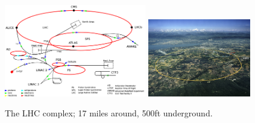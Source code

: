 \begin{figure}[hbp!]
\centering
\includegraphics[width=0.55\textwidth]{figs/lhcschematic.png}
\includegraphics[width=0.4\textwidth]{figs/lhc.jpg}
\caption{The LHC complex; 17 miles around, 500ft underground.}
\label{fig:lhc}
\end{figure}
